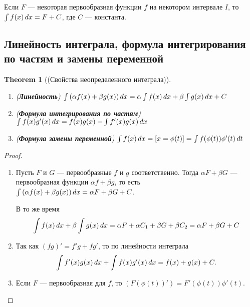 \documentclass[a4paper]{article}
\theoremstyle{named}
\newtheorem*{namedtheorem}{Theorem}
\renewcommand{\int}{\intop}
\begin{document}
        Если $F$ --- некоторая первообразная функции $f$ на некотором интервале $I$, то $\int f(x) \dd x = F + C$, где $C$ --- константа.

        \subsection{Линейность интеграла, формула интегрирования по частям и замены переменной}

        \begin{namedtheorem}[(Свойства неопределенного интеграла)]~
            \begin{enumerate}
            \item (\textbf{Линейность})
                $\int \left(\alpha f(x) + \beta g(x)\right) \dd x = \alpha \int f(x) \dd x + \beta \int g(x) \dd x + C$

            \item (\textbf{Формула интегрирования по частям})
                $\int f(x)g'(x) \dd x = f(x)g(x) - \int f'(x)g(x) \dd x$

            \item (\textbf{Формула замены переменной})
                $\int f(x) \dd x = [x = \phi(t)] = \int f(\phi(t))\phi'(t) \dd t$
            \end{enumerate}
        \end{namedtheorem}

        \begin{proof}~
            \begin{enumerate}
            \item
                Пусть $F$ и $G$ --- первообразные $f$ и $g$ соответственно. Тогда $\alpha F + \beta G$ --- первообразная функции $\alpha f + \beta g$, то есть $\int \left(\alpha f(x) + \beta g(x)\right) \dd x = \alpha F + \beta G + C$.

                В то же время
                \begin{equation*}
                    \int f(x) \dd x  +\beta \int g(x) \dd x = \alpha F + \alpha C_1 + \beta G + \beta C_2 = \alpha F + \beta G + C
                \end{equation*}

            \item
                Так как $(fg)' = f'g + fg'$, то по линейности интеграла
                \begin{equation*}
                    \int f'(x)g(x) \dd x + \int f(x)g'(x) \dd x = f(x) + g(x) + C.
                \end{equation*}

            \item
                Если $F$ --- первообразная для $f$, то $(F(\phi(t))') = F'(\phi(t))\phi'(t)$.
            \end{enumerate}
        \end{proof}
\end{document}
